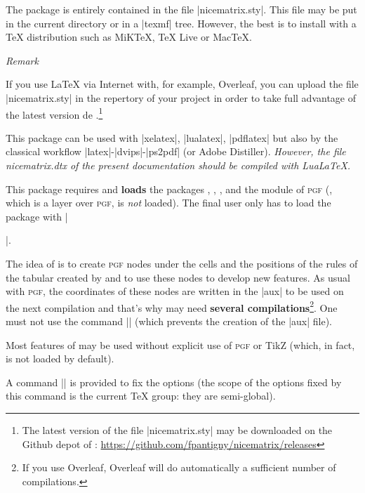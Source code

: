 \documentclass[dvipsnames]{article}%
\begin{document}
\vspace{1cm}
The package  is entirely contained in the file
|nicematrix.sty|. This file may be put in the current directory or in a
|texmf| tree. However, the best is to install  with a TeX
distribution such as MiKTeX, TeX Live or MacTeX.

\medskip
\emph{Remark}\par\nobreak

If you use LaTeX via Internet with, for example, Overleaf, you
can upload the file |nicematrix.sty| in the repertory of your 
project in order to take full advantage of the latest version de
.\footnote{The latest version of the file
|nicematrix.sty| may be downloaded on the Github depot of :\newline
\small
\url{https://github.com/fpantigny/nicematrix/releases}}

\medskip
This package can be used with |xelatex|, |lualatex|, |pdflatex| but also by
the classical workflow |latex|-|dvips|-|ps2pdf| (or Adobe Distiller).
\textsl{However, the file nicematrix.dtx of the present documentation should
be compiled with LuaLaTeX.}

\medskip
This package requires and \textbf{loads} the packages ,
, ,  and the module  of
\textsc{pgf} (, which is a layer over \textsc{pgf}, is \emph{not}
loaded). The final user only has to load the package with
|\usepackage{nicematrix}|.


\medskip
The idea of  is to create \textsc{pgf} nodes under the cells
and the positions of the rules of the tabular created by  and to
use these nodes to develop new features. As usual with \textsc{pgf}, the
coordinates of these nodes are written in the |aux| to be used on the next
compilation and that's why  may need \textbf{several
compilations}\footnote{If you use Overleaf, Overleaf will do automatically
a sufficient number of compilations.}. One must not use the command |\nofiles|
(which prevents the creation of the |aux| file).

\medskip
Most features of  may be used without explicit use of
\textsc{pgf} or TikZ (which, in fact, is not loaded by default).

\medskip
{}
A command |\NiceMatrixOptions| is provided to fix the options (the
scope of the options fixed by this command is the current TeX group: they are
semi-global). 
\end{document}
